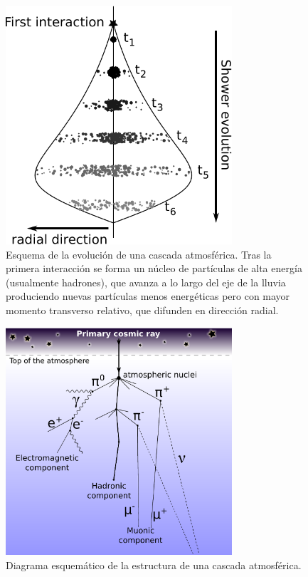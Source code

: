 %
\begin{figure}[ht]
\begin{center}
\includegraphics[width=0.75\textwidth]{fig/EASAuger/lluvia1_english.pdf}
\caption{Esquema de la evolución de una cascada atmosférica. Tras la primera interacción se forma un núcleo de partículas de alta energía (usualmente hadrones), que avanza a lo largo del eje de la lluvia produciendo nuevas partículas menos energéticas pero con mayor momento transverso relativo, que difunden en dirección radial.}
\label{fig:lluvia1}
\end{center}
\end{figure}
%
%
\begin{figure}[ht]
\begin{center}
\includegraphics[width=0.75\textwidth]{fig/EASAuger/showerSchema_english.pdf}
\caption{Diagrama esquemático de la estructura de una cascada atmosférica.}
\label{fig:showerSchema}
\end{center}
\end{figure}
%

